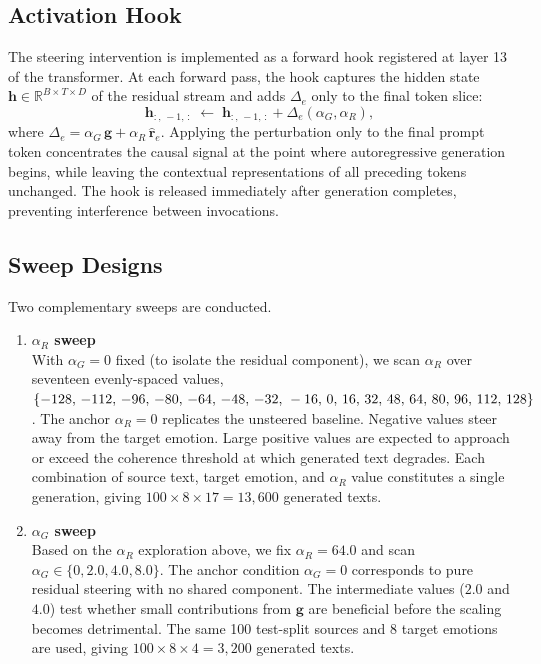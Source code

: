 \subsection{Activation Hook}
\label{subsec:activation_hook}
The steering intervention is implemented as a forward hook registered at layer 13 of the transformer. At each forward pass, the hook captures the hidden state $\mathbf{h} \in \mathbb{R}^{B \times T \times D}$ of the residual stream and adds $\Delta_e$ only to the final token slice:
\[
\mathbf{h}_{:,\,-1,\,:} \;\leftarrow\; \mathbf{h}_{:,\,-1,\,:} + \Delta_e(\alpha_G, \alpha_R),
\]
where $\Delta_e = \alpha_G\,\mathbf{g} + \alpha_R\,\hat{\mathbf{r}}_e$. Applying the perturbation only to the final prompt token concentrates the causal signal at the point where autoregressive generation begins, while leaving the contextual representations of all preceding tokens unchanged. The hook is released immediately after generation completes, preventing interference between invocations.

\subsection{Sweep Designs}

Two complementary sweeps are conducted.

\begin{enumerate}
  \item \textbf{$\alpha_R$ sweep} \\
  With $\alpha_G = 0$ fixed (to isolate the residual component), we scan $\alpha_R$ over seventeen evenly-spaced values, $\{-128,\,-112,\,-96,\,-80,\,-64,\,-48,\,-32,\\\,-16,\,0,\,16,\,32,\,48,\,64,\,80,\,96,\,112,\,128\}$. The anchor $\alpha_R = 0$ replicates the unsteered baseline. Negative values steer away from the target emotion. Large positive values are expected to approach or exceed the coherence threshold at which generated text degrades. Each combination of source text, target emotion, and $\alpha_R$ value constitutes a single generation, giving $100 \times 8 \times 17 = 13{,}600$ generated texts.
  \item \textbf{$\alpha_G$ sweep} \\
  Based on the $\alpha_R$ exploration above, we fix $\alpha_R = 64.0$ and scan $\alpha_G \in \{0, 2.0, 4.0, 8.0\}$. The anchor condition $\alpha_G = 0$ corresponds to pure residual steering with no shared component. The intermediate values ($2.0$ and $4.0$) test whether small contributions from $\mathbf{g}$ are beneficial before the scaling becomes detrimental. The same 100 test-split sources and 8 target emotions are used, giving $100 \times 8 \times 4 = 3{,}200$ generated texts.
\end{enumerate}

